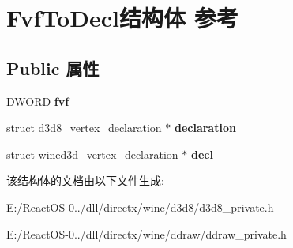 \hypertarget{struct_fvf_to_decl}{}\section{Fvf\+To\+Decl结构体 参考}
\label{struct_fvf_to_decl}
\subsection*{Public 属性}
\begin{DoxyCompactItemize}
\item 
\mbox{\label{struct_fvf_to_decl_ac76f12a3921ef29b3eb5b3507759c7bc}} 
D\+W\+O\+RD {\bfseries fvf}
\item 
\mbox{\label{struct_fvf_to_decl_a491b9fa95a1c073539845bfd78daf0c2}} 
\hyperlink{interfacestruct}{struct} \hyperlink{structd3d8__vertex__declaration}{d3d8\+\_\+vertex\+\_\+declaration} $\ast$ {\bfseries declaration}
\item 
\mbox{\label{struct_fvf_to_decl_ac19c369dcac2b8f0ec90b8fbbd3491e7}} 
\hyperlink{interfacestruct}{struct} \hyperlink{structwined3d__vertex__declaration}{wined3d\+\_\+vertex\+\_\+declaration} $\ast$ {\bfseries decl}
\end{DoxyCompactItemize}


该结构体的文档由以下文件生成\+:\begin{DoxyCompactItemize}
\item 
E\+:/\+React\+O\+S-\/0../dll/directx/wine/d3d8/d3d8\+\_\+private.\+h\item 
E\+:/\+React\+O\+S-\/0../dll/directx/wine/ddraw/ddraw\+\_\+private.\+h\end{DoxyCompactItemize}
